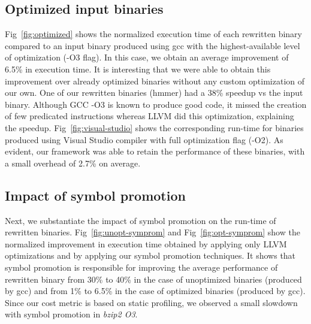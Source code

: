 \subsection{Optimized input binaries}
Fig~\ref{fig:optimized} shows the normalized execution time of each rewritten binary compared to an input binary produced using gcc with the highest-available level of optimization (-O3 flag). In this case, we obtain an average improvement of 6.5\% in execution time. It is interesting that we were able to obtain this improvement over already optimized binaries without any custom optimization of our own. One of our rewritten binaries (hmmer) had a 38\% speedup vs the input binary. Although GCC -O3 is known to produce good code, it missed the creation of few predicated instructions whereas LLVM did this optimization, explaining the speedup. Fig~\ref{fig:visual-studio} shows the corresponding run-time for binaries produced using Visual Studio compiler with full optimization flag (-O2). As evident, our framework was able to retain the performance of these binaries, with a small overhead of 2.7\% on average. 

%
\subsection{Impact of symbol promotion}
Next, we substantiate the impact of symbol promotion on the run-time of rewritten binaries. Fig~\ref{fig:unopt-symprom} and Fig~\ref{fig:opt-symprom} show the normalized improvement in execution time obtained by applying only LLVM optimizations and by applying our symbol promotion techniques. It shows that symbol promotion is responsible for improving the average performance of rewritten binary from 30\% to 40\% in the case of unoptimized binaries (produced by gcc) and from 1\% to 6.5\% in the case of optimized binaries (produced by gcc). Since our cost metric is based on static profiling, we observed a small slowdown with symbol promotion in \emph{bzip2 O3}. 

